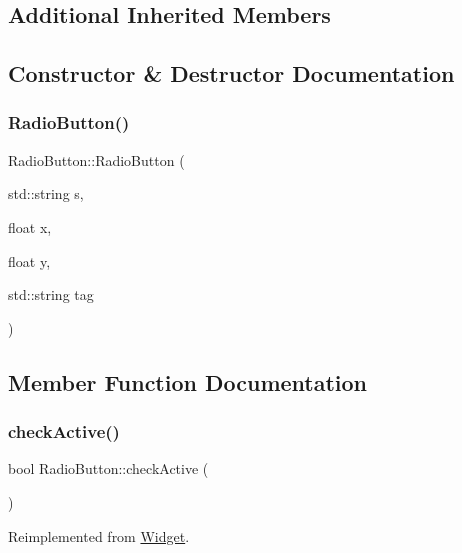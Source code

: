 \subsection*{Additional Inherited Members}


\subsection{Constructor \& Destructor Documentation}
\mbox{\label{class_radio_button_adb0f278298ab8f6eda40f713e3791821}} 
\subsubsection{\texorpdfstring{RadioButton()}{RadioButton()}}
{\footnotesize\ttfamily Radio\+Button\+::\+Radio\+Button (\begin{DoxyParamCaption}\item[{std\+::string}]{s,  }\item[{float}]{x,  }\item[{float}]{y,  }\item[{std\+::string}]{tag }\end{DoxyParamCaption})}



\subsection{Member Function Documentation}
\mbox{\label{class_radio_button_ad4e47880a03d6854e5664817015187a2}} 
\subsubsection{\texorpdfstring{checkActive()}{checkActive()}}
{\footnotesize\ttfamily bool Radio\+Button\+::check\+Active (\begin{DoxyParamCaption}{ }\end{DoxyParamCaption})\hspace{0.3cm}{\ttfamily [virtual]}}



Reimplemented from \mbox{\hyperlink{class_widget_ac87a7f54a06b9a2329884175f6a9c837}{Widget}}.

